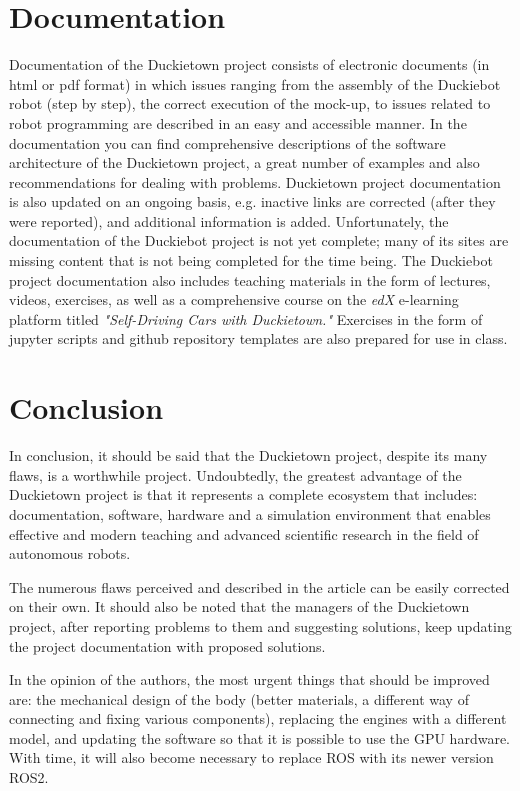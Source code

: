 \documentclass[conference]{IEEEtran}
\begin{document}
\section{Documentation}\label{sec:documentation}
Documentation of the Duckietown project consists of electronic documents (in html or pdf format) in which issues ranging from the assembly of the Duckiebot robot (step by step), the correct execution of the mock-up, to issues related to robot programming are described in an easy and accessible manner.
In the documentation you can find comprehensive descriptions of the software architecture of the Duckietown project, a great number of examples and also recommendations for dealing with problems. Duckietown project documentation is also updated on an ongoing basis, e.g. inactive links are corrected (after they were reported), and additional information is added.
Unfortunately, the documentation of the Duckiebot project is not yet complete; many of its sites are missing content that is not being completed for the time being.
The Duckiebot project documentation also includes teaching materials in the form of lectures, videos, exercises, as well as a comprehensive course on the \emph{edX} e-learning platform titled \emph{"Self-Driving Cars with Duckietown."} Exercises in the form of jupyter scripts and github repository templates are also prepared for use in class.

\section{Conclusion}\label{sec:conclusion}
In conclusion, it should be said that the Duckietown project, despite its many flaws, is a worthwhile project. Undoubtedly, the greatest advantage of the Duckietown project is that it represents a complete ecosystem that includes: documentation, software, hardware and a simulation environment that enables effective and modern teaching and advanced scientific research in the field of autonomous robots. 

The numerous flaws perceived and described in the article can be easily corrected on their own. It should also be noted that the managers of the Duckietown project, after reporting problems to them and suggesting solutions, keep updating the project documentation with proposed solutions. 

In the opinion of the authors, the most urgent things that should be improved are: the mechanical design of the body (better materials, a different way of connecting and fixing various components), replacing the engines with a different model, and updating the software so that it is possible to use the GPU hardware. With time, it will also become necessary to replace ROS with its newer version ROS2.




\end{document}
